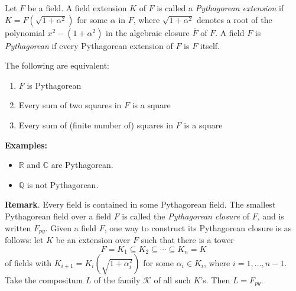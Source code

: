 \documentclass[12pt]{article}
\begin{document}
Let $F$ be a field.  A field extension $K$ of $F$ is called a \emph{Pythagorean extension} if $K = F(\sqrt{1+\alpha^2})$ for some $\alpha$ in $F$, where $\sqrt{1+\alpha^2}$ denotes a root of the polynomial $x^2-(1+\alpha^2)$ in the algebraic closure $\overline{F}$ of $F$.  A field $F$ is \emph{Pythagorean} if every Pythagorean extension of $F$ is $F$ itself.  

The following are equivalent:
\begin{enumerate}
\item
$F$ is Pythagorean
\item
Every sum of two squares in $F$ is a square
\item
Every sum of (finite number of) squares in $F$ is a square
\end{enumerate}

\textbf{Examples:}
\begin{itemize}
\item
$\mathbb{R}$ and $\mathbb{C}$ are Pythagorean.
\item
$\mathbb{Q}$ is not Pythagorean.
\end{itemize}

\textbf{Remark}.  Every field is contained in some Pythagorean field.  The smallest Pythagorean field over a field $F$ is called the \emph{Pythagorean closure} of $F$, and is written $F_{py}$.  Given a field $F$, one way to construct its Pythagorean closure is as follows: let $K$ be an extension over $F$ such that there is a tower
$$F=K_1\subseteq K_2\subseteq \cdots \subseteq K_n=K$$
of fields with $K_{i+1}=K_i(\sqrt{1+\alpha_i^2})$ for some $\alpha_i\in K_i$, where $i=1,\ldots,n-1$.  Take the compositum $L$ of the family $\mathcal{K}$ of all such $K$'s.  Then $L=F_{py}$.
\end{document}
